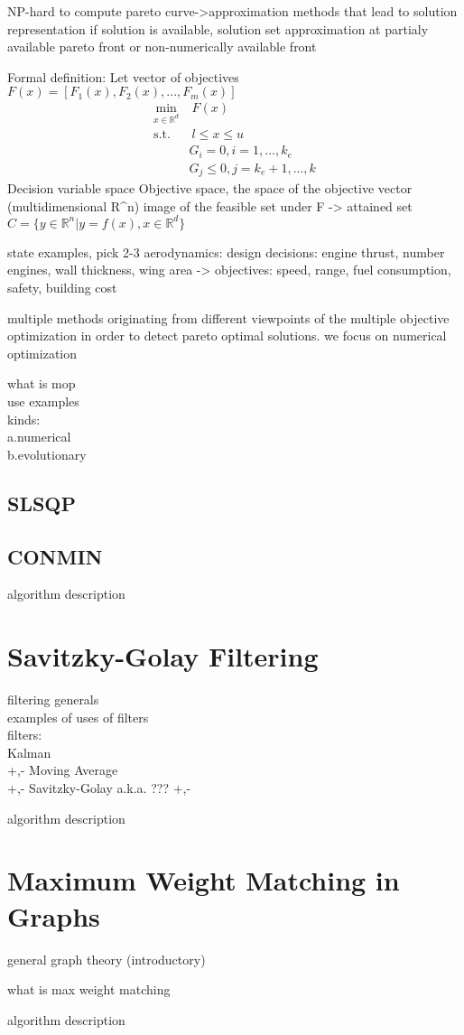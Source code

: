NP-hard to compute pareto curve->approximation methods that lead to solution representation if solution is available, solution set approximation at partialy available pareto front or non-numerically available front 

Formal definition:
Let vector of objectives $F(x)=[F_1(x), F_2(x), ..., F_m(x)]$
\begin{align*}
\min_{x \in \mathbb{R}^d}&\ {F(x)}\\
\text{s.t.}&\ l\leq x \leq u\\
			&G_i=0, i=1,...,k_e\\
			&G_j\leq 0, j=k_e+1, ...,k
\end{align*}
Decision variable space 
Objective space, the space of the objective vector (multidimensional R^n)
image of the feasible set under F -> attained set $C=\{y \in \mathbb{R}^n | y=f(x), x\in \mathbb{R}^d\}$

state examples, pick 2-3 
aerodynamics: design decisions: engine thrust, number engines, wall thickness, wing area -> objectives: speed, range, fuel consumption, safety, building cost

multiple methods originating from different viewpoints of the multiple objective optimization in order to detect pareto optimal solutions. we focus on numerical optimization

what is mop\\
use examples\\
kinds:\\
	a.numerical\\
	b.evolutionary

\subsection{SLSQP} \label{subsec:theorBack-SLSQP}


\subsection{CONMIN} \label{subsec:theorBack-CONMIN}

algorithm description

\section{Savitzky-Golay Filtering} \label{sec:theorBack-SavitzkyGolay}

filtering generals\\
examples of uses of filters\\
filters:\\
	Kalman\\
		+,-
	Moving Average\\
		+,-
	Savitzky-Golay a.k.a. ???
		+,-

algorithm description

\section{Maximum Weight Matching in Graphs} \label{sec:theorBack-MWMGraphs}

general graph theory (introductory)

what is max weight matching

algorithm description
